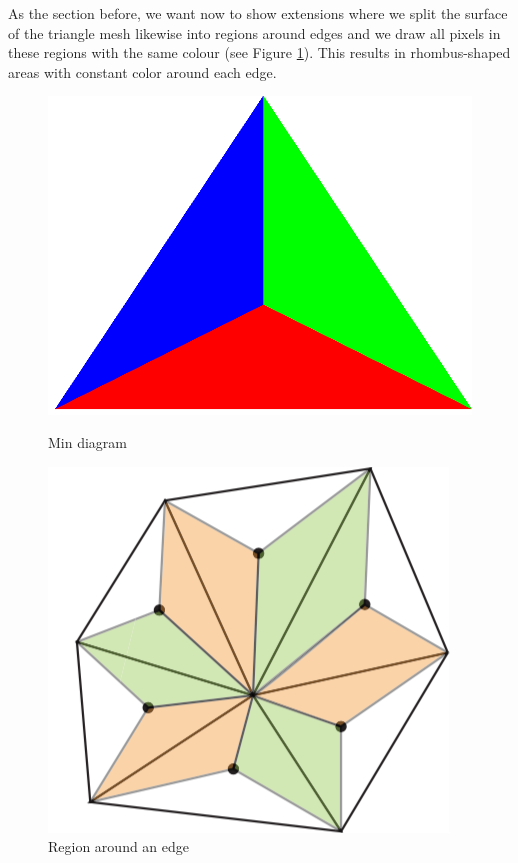 As the section before, we want now to show extensions where we split the surface of the triangle mesh likewise into regions around  edges and we draw all pixels in these regions with the same colour (see Figure \ref{fig:edge-area}). This results in rhombus-shaped areas with constant color around each edge.

\begin{figure}[H]
    \centering
    \centering
    \includegraphics[scale=0.15]{images/min.png}
    \caption{Min diagram}\label{fig:min-diagram}
    \endminipage\hfill
    \centering
    \includegraphics[scale=0.6]{images/edge-area.png}
    \caption{Region around an edge}\label{fig:edge-area}
    \endminipage
\end{figure}

